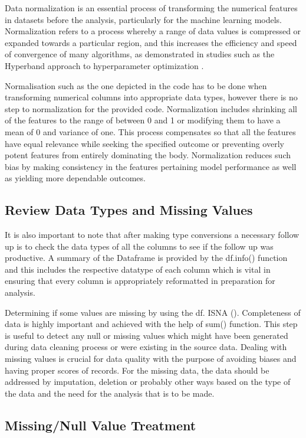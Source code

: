 \documentclass[12pt, a4paper,oneside]{book}
\numberwithin{equation}{section}
\begin{document}
Data normalization is an essential process of transforming the numerical features in datasets before the analysis, particularly for the machine learning models. Normalization refers to a process whereby a range of data values is compressed or expanded towards a particular region, and this increases the efficiency and speed of convergence of many algorithms, as demonstrated in studies such as the Hyperband approach to hyperparameter optimization \cite{li2018hyperband}.

Normalisation such as the one depicted in the code has to be done when transforming numerical columns into appropriate data types, however there is no step to normalization for the provided code. Normalization includes shrinking all of the features to the range of between 0 and 1 or modifying them to have a mean of 0 and variance of one. This process compensates so that all the features have equal relevance while seeking the specified outcome or preventing overly potent features from entirely dominating the body. Normalization reduces such bias by making consistency in the features pertaining model performance as well as yielding more dependable outcomes.

\subsection{Review Data Types and Missing Values} 

It is also important to note that after making type conversions a necessary follow up is to check the data types of all the columns to see if the follow up was productive. A summary of the Dataframe is provided by the df.info() function and this includes the respective datatype of each column which is vital in ensuring that every column is appropriately reformatted in preparation for analysis.

Determining if some values are missing by using the df. ISNA (). Completeness of data is highly important and achieved with the help of sum() function. This step is useful to detect any null or missing values which might have been generated during data cleaning process or were existing in the source data. Dealing with missing values is crucial for data quality with the purpose of avoiding biases and having proper scores of records. For the missing data, the data should be addressed by imputation, deletion or probably other ways based on the type of the data and the need for the analysis that is to be made. 

\subsection{ Missing/Null Value Treatment}
\end{document}
